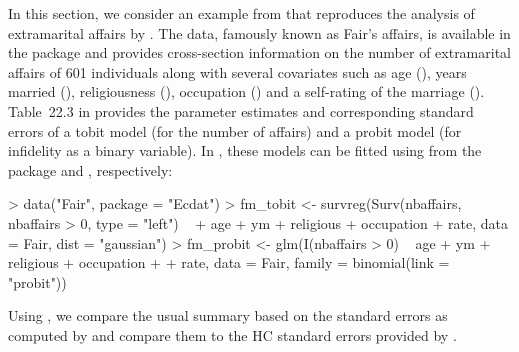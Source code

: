 \documentclass{Z}
\begin{document}
In this section, we consider an
example from \citet[Section~22.3.6]{hac:Greene:2003} that reproduces
the analysis of extramarital affairs by \citet{hac:Fair:1978}. The data,
famously known as Fair's affairs, is available in the  package
\citep{hac:Croissant:2005} and provides cross-section information on the number
of extramarital affairs of 601 individuals along with several covariates such
as age (), years married (), religiousness (),
occupation () and a self-rating of the marriage ().
Table~22.3 in \cite{hac:Greene:2003} provides the parameter estimates and corresponding
standard errors of a tobit model (for the number of affairs) and a probit model
(for infidelity as a binary variable). In , these models can be
fitted using  from the  package \citep{hac:Thernau+Lumley:2006}
and , respectively:

\begin{Schunk}
\begin{Sinput}
> data("Fair", package = "Ecdat")
> fm_tobit <- survreg(Surv(nbaffairs, nbaffairs > 0, type = "left") ~ 
+     age + ym + religious + occupation + rate, data = Fair, dist = "gaussian")
> fm_probit <- glm(I(nbaffairs > 0) ~ age + ym + religious + occupation + 
+     rate, data = Fair, family = binomial(link = "probit"))
\end{Sinput}
\end{Schunk}

Using , we compare the usual summary based on the standard
errors as computed by  \citep[which reproduces the results in][]{hac:Greene:2003}
and compare them to the HC standard errors provided by .
\end{document}
